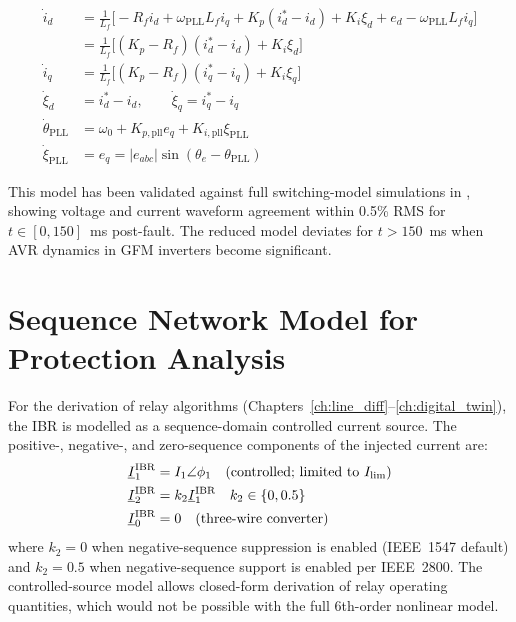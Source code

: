 \begin{align}
  \dot{i}_d &= \frac{1}{L_f}\bigl[-R_f i_d + \omega_\mathrm{PLL} L_f i_q
    + K_p(i_d^\ast - i_d) + K_i \xi_d + e_d - \omega_\mathrm{PLL} L_f i_q\bigr]
  \nonumber \\
  &= \frac{1}{L_f}\bigl[(K_p - R_f)(i_d^\ast - i_d) + K_i \xi_d\bigr]
  \label{eq:ch2_park6_id} \\
  \dot{i}_q &= \frac{1}{L_f}\bigl[(K_p - R_f)(i_q^\ast - i_q) + K_i \xi_q\bigr]
  \label{eq:ch2_park6_iq} \\
  \dot{\xi}_d &= i_d^\ast - i_d, \qquad
  \dot{\xi}_q = i_q^\ast - i_q
  \label{eq:ch2_park6_xi} \\
  \dot{\theta}_\mathrm{PLL} &= \omega_0 + K_{p,\mathrm{pll}} e_q
    + K_{i,\mathrm{pll}} \xi_\mathrm{PLL}
  \label{eq:ch2_park6_theta} \\
  \dot{\xi}_\mathrm{PLL} &= e_q = |e_{abc}|\sin(\theta_e - \theta_\mathrm{PLL})
  \label{eq:ch2_park6_xipll}
\end{align}

This model has been validated against full switching-model simulations in
\citep{SAMBP_TR45}, showing voltage and current waveform agreement within
0.5\% RMS for $t \in [0, 150]$~ms post-fault. The reduced model deviates
for $t > 150$~ms when AVR dynamics in GFM inverters become significant.

\section{Sequence Network Model for Protection Analysis}
\label{sec:ch2_sequence}

For the derivation of relay algorithms (Chapters~\ref{ch:line_diff}--\ref{ch:digital_twin}),
the IBR is modelled as a sequence-domain controlled current source.
The positive-, negative-, and zero-sequence components of the injected
current are:
\begin{align}
  \underline{I}_1^\mathrm{IBR} &= I_1 \angle \phi_1
    \quad\text{(controlled; limited to $I_\mathrm{lim}$)}
  \label{eq:ch2_seq_pos} \\
  \underline{I}_2^\mathrm{IBR} &= k_2 \underline{I}_1^\mathrm{IBR}
    \quad k_2 \in \{0, 0.5\}
  \label{eq:ch2_seq_neg} \\
  \underline{I}_0^\mathrm{IBR} &= 0
    \quad\text{(three-wire converter)}
  \label{eq:ch2_seq_zer}
\end{align}
where $k_2 = 0$ when negative-sequence suppression is enabled (IEEE~1547
default) and $k_2 = 0.5$ when negative-sequence support is enabled per
IEEE~2800. The controlled-source model allows closed-form derivation of
relay operating quantities, which would not be possible with the full
6th-order nonlinear model.

